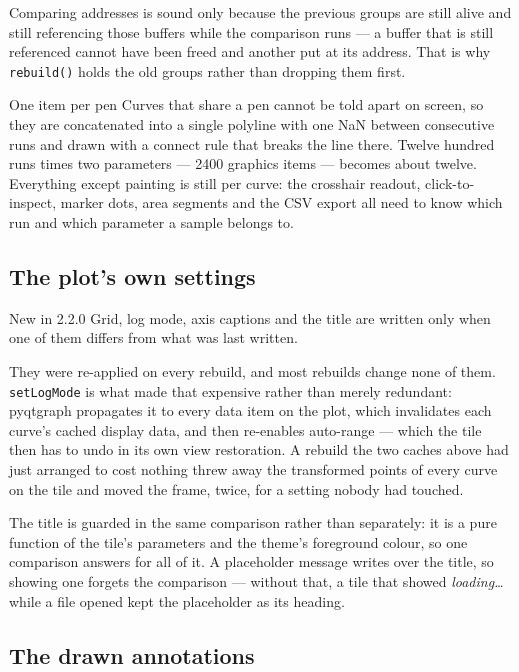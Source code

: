 \documentclass[11pt,a4paper,oneside]{report}
\newcommand{\appver}{2.2.0}
\newcommand{\code}[1]{\texttt{#1}}
\begin{document}
Comparing addresses is sound only because the previous groups are still alive
and still referencing those buffers while the comparison runs --- a buffer that
is still referenced cannot have been freed and another put at its address. That
is why \code{rebuild()} holds the old groups rather than dropping them first.

\begin{aoenote}{One item per pen}
Curves that share a pen cannot be told apart on screen, so they are concatenated
into a single polyline with one NaN between consecutive runs and drawn with a
connect rule that breaks the line there. Twelve hundred runs times two
parameters --- 2400 graphics items --- becomes about twelve. Everything except
painting is still per curve: the crosshair readout, click-to-inspect, marker
dots, area segments and the CSV export all need to know which run and which
parameter a sample belongs to.
\end{aoenote}

\subsection{The plot's own settings}

\begin{aoenew}{New in \appver}
Grid, log mode, axis captions and the title are written only when one of them
differs from what was last written.
\end{aoenew}

They were re-applied on every rebuild, and most rebuilds change none of them.
\code{setLogMode} is what made that expensive rather than merely redundant:
pyqtgraph propagates it to every data item on the plot, which invalidates each
curve's cached display data, and then re-enables auto-range --- which the tile
then has to undo in its own view restoration. A rebuild the two caches above had
just arranged to cost nothing threw away the transformed points of every curve
on the tile and moved the frame, twice, for a setting nobody had touched.

The title is guarded in the same comparison rather than separately: it is a pure
function of the tile's parameters and the theme's foreground colour, so one
comparison answers for all of it. A placeholder message writes over the title,
so showing one forgets the comparison --- without that, a tile that showed
\emph{loading\ldots} while a file opened kept the placeholder as its heading.

\subsection{The drawn annotations}
\end{document}
